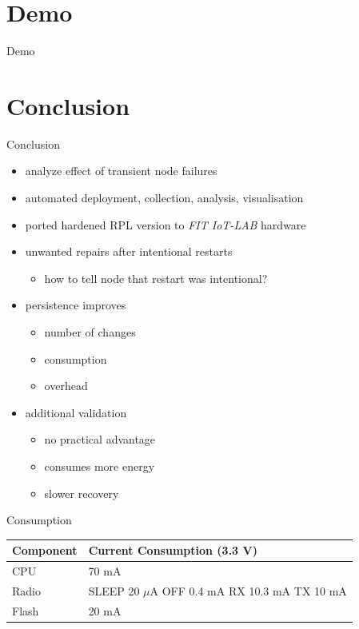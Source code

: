 \documentclass[fleqn,11pt,aspectratio=1610]{beamer}
\newcommand{\fitlab}{\emph{FIT IoT-LAB} }
\begin{document}
\section{Demo}

\begin{frame}{Demo}

\end{frame}

\section{Conclusion}

\begin{frame}{Conclusion}
  \begin{itemize}
    \item<1-> analyze effect of transient node failures
    \item<2-> automated deployment, collection, analysis, visualisation
    \item<3-> ported hardened RPL version to \fitlab hardware
    \item<4-> unwanted repairs after intentional restarts
      \begin{itemize}
      \item how to tell node that restart was intentional?
      \end{itemize}
    \item<5-> persistence improves
      \begin{itemize}
      \item number of changes
      \item consumption
      \item overhead
      \end{itemize}
    \item<6-> additional validation
      \begin{itemize}
      \item no practical advantage
      \item consumes more energy
      \item slower recovery
      \end{itemize}
    \end{itemize}
\end{frame}

%
%

\begin{frame}{Consumption}
  \begin{table}
    \centering
    \begin{tabular}{lp{140pt}}
      \toprule
      Component & Current Consumption (3.3 V) \\
      \midrule
      CPU & 70 mA \\
      Radio & SLEEP 20 $\mu$A \newline
              OFF 0.4 mA \newline
              RX 10.3 mA \newline
              TX 10 mA\\
      Flash & 20 mA 
    \end{tabular}
    \label{tab:consum}
  \end{table}
\end{frame}
\end{document}
